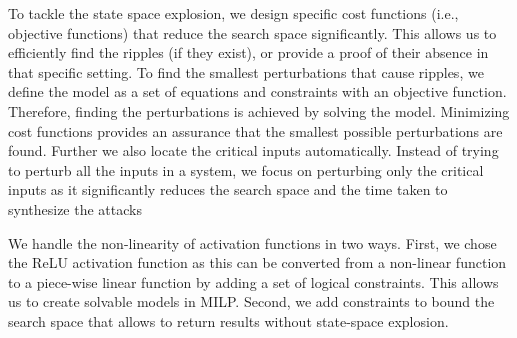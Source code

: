 To tackle the state space explosion, we design \attack specific cost functions (i.e., objective functions) that reduce the search space significantly. This allows us to efficiently find the ripples (if they exist), or provide a proof of their absence in that specific setting. To find the smallest perturbations that cause  ripples, we define the model as a set of equations and constraints with an objective function. Therefore, finding the perturbations is achieved by solving the model. Minimizing cost functions provides an assurance that the smallest possible perturbations are found. %
Further we also locate the critical inputs automatically. Instead of trying to perturb all the inputs in a system, we focus on perturbing only the critical %
inputs as it significantly reduces the search space and the time taken to synthesize the attacks %

We handle the non-linearity of activation functions in two ways. First, we chose the ReLU activation function as this can be converted from a non-linear function to a piece-wise linear function by adding a set of logical constraints. This allows us to create solvable models in MILP. Second, we add constraints to bound the search space that allows \tool to return results without state-space explosion. %



